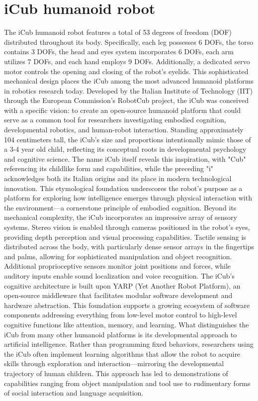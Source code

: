 \chapter{iCub humanoid robot}
The iCub humanoid robot features a total of 53 degrees of freedom (DOF) distributed throughout its body. 
Specifically, each leg possesses 6 DOFs, the torso contains 3 DOFs, the head and eyes system incorporates 6 DOFs, each arm utilizes 7 DOFs, and each hand employs 9 DOFs. Additionally, a dedicated servo motor controls the opening and closing of the robot's eyelids.
This sophisticated mechanical design places the iCub among the most advanced humanoid platforms in robotics research today.
Developed by the Italian Institute of Technology (IIT) through the European Commission's RobotCub project, the iCub was conceived with a specific vision: to create an open-source humanoid platform that could serve as a common tool for researchers investigating embodied cognition, developmental robotics, and human-robot interaction. Standing approximately 104 centimeters tall, the iCub's size and proportions intentionally mimic those of a 3-4 year old child, reflecting its conceptual roots in developmental psychology and cognitive science.
The name iCub itself reveals this inspiration, with "Cub" referencing its childlike form and capabilities, while the preceding "i" acknowledges both its Italian origins and its place in modern technological innovation. This etymological foundation underscores the robot's purpose as a platform for exploring how intelligence emerges through physical interaction with the environment—a cornerstone principle of embodied cognition.
Beyond its mechanical complexity, the iCub incorporates an impressive array of sensory systems. Stereo vision is enabled through cameras positioned in the robot's eyes, providing depth perception and visual processing capabilities. Tactile sensing is distributed across the body, with particularly dense sensor arrays in the fingertips and palms, allowing for sophisticated manipulation and object recognition. Additional proprioceptive sensors monitor joint positions and forces, while auditory inputs enable sound localization and voice recognition.
The iCub's cognitive architecture is built upon YARP (Yet Another Robot Platform), an open-source middleware that facilitates modular software development and hardware abstraction. This foundation supports a growing ecosystem of software components addressing everything from low-level motor control to high-level cognitive functions like attention, memory, and learning.
What distinguishes the iCub from many other humanoid platforms is its developmental approach to artificial intelligence. Rather than programming fixed behaviors, researchers using the iCub often implement learning algorithms that allow the robot to acquire skills through exploration and interaction—mirroring the developmental trajectory of human children. This approach has led to demonstrations of capabilities ranging from object manipulation and tool use to rudimentary forms of social interaction and language acquisition.
